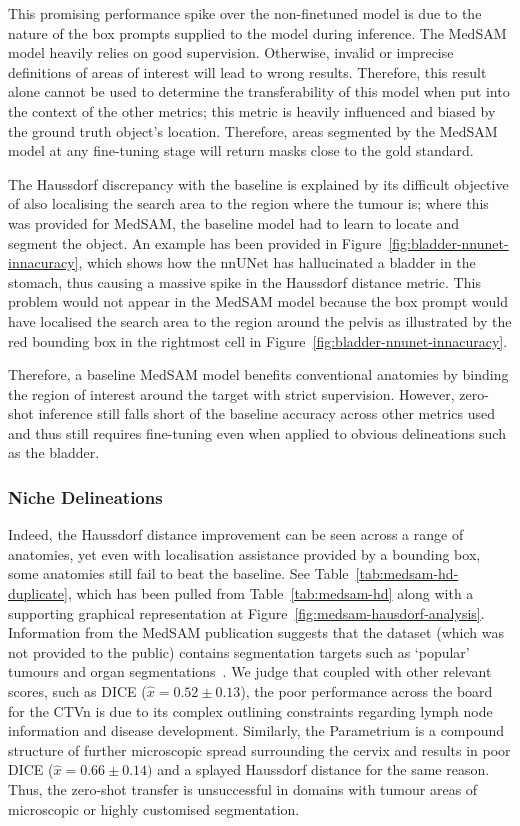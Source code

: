 \documentclass[11pt,twoside]{report}
\begin{document}
This promising performance spike over the non-finetuned model is due to the nature of the box prompts supplied to the model during inference. The MedSAM model heavily relies on good supervision. Otherwise, invalid or imprecise definitions of areas of interest will lead to wrong results. Therefore, this result alone cannot be used to determine the transferability of this model when put into the context of the other metrics; this metric is heavily influenced and biased by the ground truth object's location. Therefore, areas segmented by the MedSAM model at any fine-tuning stage will return masks close to the gold standard.

The Haussdorf discrepancy with the baseline is explained by its difficult objective of also localising the search area to the region where the tumour is; where this was provided for MedSAM, the baseline model had to learn to locate and segment the object. An example has been provided in Figure~\ref{fig:bladder-nnunet-innacuracy}, which shows how the nnUNet has hallucinated a bladder in the stomach, thus causing a massive spike in the Haussdorf distance metric. This problem would not appear in the MedSAM model because the box prompt would have localised the search area to the region around the pelvis as illustrated by the red bounding box in the rightmost cell in Figure~\ref{fig:bladder-nnunet-innacuracy}.


Therefore, a baseline MedSAM model benefits conventional anatomies by binding the region of interest around the target with strict supervision. However, zero-shot inference still falls short of the baseline accuracy across other metrics used and thus still requires fine-tuning even when applied to obvious delineations such as the bladder.

\subsubsection{Niche Delineations}

Indeed, the Haussdorf distance improvement can be seen across a range of anatomies, yet even with localisation assistance provided by a bounding box, some anatomies still fail to beat the baseline. See Table~\ref{tab:medsam-hd-duplicate}, which has been pulled from Table~\ref{tab:medsam-hd} along with a supporting graphical representation at Figure~\ref{fig:medsam-hausdorf-analysis}. Information from the MedSAM publication suggests that the dataset (which was not provided to the public) contains segmentation targets such as `popular' tumours and organ segmentations~\cite{Ma2024}. We judge that coupled with other relevant scores, such as DICE ($\hat{x} = 0.52 \pm 0.13$), the poor performance across the board for the CTVn is due to its complex outlining constraints regarding lymph node information and disease development. Similarly, the Parametrium is a compound structure of further microscopic spread surrounding the cervix and results in poor DICE ($\hat{x} = 0.66 \pm 0.14)$ and a splayed Haussdorf distance for the same reason. Thus, the zero-shot transfer is unsuccessful in domains with tumour areas of microscopic or highly customised segmentation. 
\end{document}
